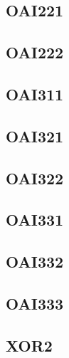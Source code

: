 \documentclass[10pt,a4paper,twoside]{article}
\begin{document}
\subsection{OAI221}

\clearpage

\subsection{OAI222}

\clearpage

\subsection{OAI311}

\clearpage

\subsection{OAI321}

\clearpage

\subsection{OAI322}

\clearpage

\subsection{OAI331}

\clearpage

\subsection{OAI332}

\clearpage

\subsection{OAI333}

\clearpage


\subsection{XOR2}

\clearpage
\end{document}
